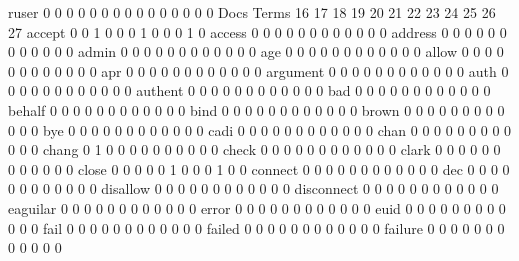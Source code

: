 \documentclass[compress,8pt]{beamer}
\begin{document}
\begin{frame}
\begin{Schunk}
  ruser                                    0 0 0 0 0 0 0 0 0  0  0  0  0  0  0
                                          Docs
Terms                                      16 17 18 19 20 21 22 23 24 25 26 27
  accept                                    0  0  1  0  0  0  1  0  0  0  1  0
  access                                    0  0  0  0  0  0  0  0  0  0  0  0
  address                                   0  0  0  0  0  0  0  0  0  0  0  0
  admin                                     0  0  0  0  0  0  0  0  0  0  0  0
  age                                       0  0  0  0  0  0  0  0  0  0  0  0
  allow                                     0  0  0  0  0  0  0  0  0  0  0  0
  apr                                       0  0  0  0  0  0  0  0  0  0  0  0
  argument                                  0  0  0  0  0  0  0  0  0  0  0  0
  auth                                      0  0  0  0  0  0  0  0  0  0  0  0
  authent                                   0  0  0  0  0  0  0  0  0  0  0  0
  bad                                       0  0  0  0  0  0  0  0  0  0  0  0
  behalf                                    0  0  0  0  0  0  0  0  0  0  0  0
  bind                                      0  0  0  0  0  0  0  0  0  0  0  0
  brown                                     0  0  0  0  0  0  0  0  0  0  0  0
  bye                                       0  0  0  0  0  0  0  0  0  0  0  0
  cadi                                      0  0  0  0  0  0  0  0  0  0  0  0
  chan                                      0  0  0  0  0  0  0  0  0  0  0  0
  chang                                     0  1  0  0  0  0  0  0  0  0  0  0
  check                                     0  0  0  0  0  0  0  0  0  0  0  0
  clark                                     0  0  0  0  0  0  0  0  0  0  0  0
  close                                     0  0  0  0  0  1  0  0  0  1  0  0
  connect                                   0  0  0  0  0  0  0  0  0  0  0  0
  dec                                       0  0  0  0  0  0  0  0  0  0  0  0
  disallow                                  0  0  0  0  0  0  0  0  0  0  0  0
  disconnect                                0  0  0  0  0  0  0  0  0  0  0  0
  eaguilar                                  0  0  0  0  0  0  0  0  0  0  0  0
  error                                     0  0  0  0  0  0  0  0  0  0  0  0
  euid                                      0  0  0  0  0  0  0  0  0  0  0  0
  fail                                      0  0  0  0  0  0  0  0  0  0  0  0
  failed                                    0  0  0  0  0  0  0  0  0  0  0  0
  failure                                   0  0  0  0  0  0  0  0  0  0  0  0

\end{Schunk}
\end{frame}
\end{document}
